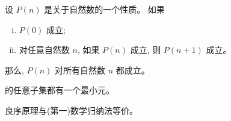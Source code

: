 
\begin{frame}{}
  \begin{theorem}[(第一)数学归纳法]
    设 $P(n)$ 是关于自然数的一个性质。
    如果
    \begin{enumerate}[(i)]
      \setlength{\itemsep}{8pt}
      \item $P(0)$ 成立;
      \item 对任意自然数 $n$, 如果 $P(n)$ 成立, 则 $P(n+1)$ 成立。
    \end{enumerate}
    \vspace{0.20cm}
    那么, $P(n)$ 对所有自然数 $n$ 都成立。
  \end{theorem}
\end{frame}

\begin{frame}{}
  \begin{definition}
    的任意子集都有一个最小元。
  \end{definition}

  \pause
  \vspace{0.60cm}
  \begin{theorem}{}
    良序原理与(第一)数学归纳法等价。
  \end{theorem}
\end{frame}

